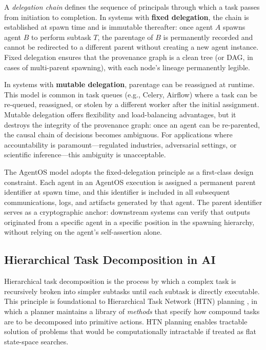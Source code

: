 A \textit{delegation chain} defines the sequence of principals through which a task passes from initiation to completion. In systems with \textbf{fixed delegation}, the chain is established at spawn time and is immutable thereafter: once agent $A$ spawns agent $B$ to perform subtask $T$, the parentage of $B$ is permanently recorded and cannot be redirected to a different parent without creating a new agent instance. Fixed delegation ensures that the provenance graph is a clean tree (or DAG, in cases of multi-parent spawning), with each node's lineage permanently legible.

In systems with \textbf{mutable delegation}, parentage can be reassigned at runtime. This model is common in task queues (e.g., Celery, Airflow) where a task can be re-queued, reassigned, or stolen by a different worker after the initial assignment. Mutable delegation offers flexibility and load-balancing advantages, but it destroys the integrity of the provenance graph: once an agent can be re-parented, the causal chain of decisions becomes ambiguous. For applications where accountability is paramount—regulated industries, adversarial settings, or scientific inference—this ambiguity is unacceptable.

The AgentOS model adopts the fixed-delegation principle as a first-class design constraint. Each agent in an AgentOS execution is assigned a permanent parent identifier at spawn time, and this identifier is included in all subsequent communications, logs, and artifacts generated by that agent. The parent identifier serves as a cryptographic anchor: downstream systems can verify that outputs originated from a specific agent in a specific position in the spawning hierarchy, without relying on the agent's self-assertion alone.

\subsection{Hierarchical Task Decomposition in AI}

Hierarchical task decomposition is the process by which a complex task is recursively broken into simpler subtasks until each subtask is directly executable. This principle is foundational to Hierarchical Task Network (HTN) planning \cite{Erol1994HTN}, in which a planner maintains a library of \textit{methods} that specify how compound tasks are to be decomposed into primitive actions. HTN planning enables tractable solution of problems that would be computationally intractable if treated as flat state-space searches.

